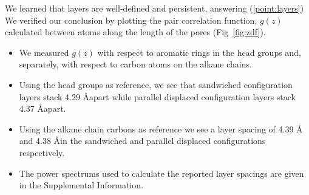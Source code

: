 \documentclass{article}
\newcommand{\angstrom}{\textup{\AA}}
\begin{document}
  We learned that layers are well-defined and persistent, answering (\ref{point:layers})
  We verified our conclusion by
  plotting the pair correlation function, $g(z)$ calculated between atoms along
  the length of the pores (Fig~\ref{fig:zdf}).
  \begin{itemize}
	\item We measured $g(z)$ with respect to aromatic rings in the head groups
	and, separately, with respect to carbon atoms on the alkane chains.
        \item Using the head groups as reference, we see that sandwiched configuration
	layers stack 4.29 \angstrom apart while parallel displaced configuration layers
	stack 4.37 \angstrom apart.
	\item Using the alkane chain carbons as reference we see a layer spacing of 4.39 \angstrom
	and 4.38 \angstrom in the sandwiched and parallel displaced configurations respectively.
        \item The power spectrums used to calculate the reported layer spacings are given in the 
        Supplemental Information.  %
  \end{itemize}
\end{document}
